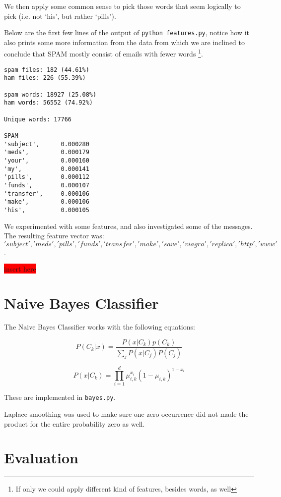 \documentclass[a4paper,11pt]{article}
\newcommand{\todo}[1]{\colorbox{red}{\color{white}#1}}
\begin{document}
We then apply some common sense to pick those words that seem logically to 
pick (i.e. not `his', but rather `pills').  

Below are the first few lines of the output of \texttt{python features.py}, 
notice how it also prints some more information from the data from which we 
are inclined to conclude that SPAM mostly consist of emails with fewer words \footnote{If only we could apply different kind of features, besides words, as well}. 
\begin{center}
\begin{verbatim}
spam files: 182 (44.61%)
ham files: 226 (55.39%)

spam words: 18927 (25.08%)
ham words: 56552 (74.92%)

Unique words: 17766

SPAM
'subject',      0.000280
'meds',         0.000179
'your',         0.000160
'my',           0.000141
'pills',        0.000112
'funds',        0.000107
'transfer',     0.000106
'make',         0.000106
'his',          0.000105
\end{verbatim}
\end{center}

We experimented with some features, and also investigated some of the 
messages. The resulting feature vector was: 
\['subject', 'meds', 'pills', 'funds', 'transfer', 'make', 'save', 'viagra', 'replica', 'http', 'www'\].

\todo{insert here}

\section{Naive Bayes Classifier}
The Naive Bayes Classifier works with the following equations: 

\begin{equation}
P(C_k|x) = \frac{P(x|C_k)p(C_k)}{\sum_j P(x|C_j)P(C_j)}
\label{eq:1}
\end{equation}

\begin{equation}
P(x|C_k)= \prod_{i=1}^d \mu^{x_i}_{i, k}(1 - \mu_{i,k})^{1-x_i}
\label{eq:2}
\end{equation}

These are implemented in \texttt{bayes.py}. 

Laplace smoothing was used to make sure one zero occurrence did not made the
product for the entire probability zero as well. 


\section{Evaluation}
\end{document}
